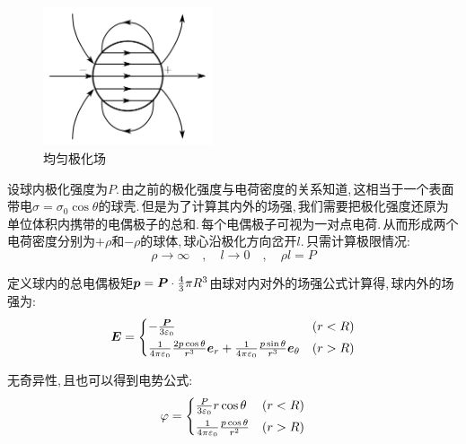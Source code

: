 \begin{figure}
\vspace{-0.4cm}
\centering
\includegraphics[width=5cm]{image/7-1-22.png}
\caption{均匀极化场}
\end{figure}
设球内极化强度为$P$.\,由之前的极化强度与电荷密度的关系知道,\,这相当于一个表面带电$\sigma=\sigma_0\cos\theta$的球壳.\,但是为了计算其内外的场强,\,我们需要把极化强度还原为单位体积内携带的电偶极子的总和.\,每个电偶极子可视为一对点电荷.\,从而形成两个电荷密度分别为$+\rho$和$-\rho$的球体,\,球心沿极化方向岔开$l$.\,只需计算极限情况:
\[\rho\to \infty \quad,\quad l\to 0 \quad,\quad \rho l=P\]

定义球内的总电偶极矩$\boldsymbol{p}=\boldsymbol{P}\cdot\frac{4}{3}\pi R^3$由球对内对外的场强公式计算得,\,球内外的场强为:
\[\boldsymbol{E}=\begin{cases}
-\frac{\boldsymbol{P}}{3\varepsilon_0}&(r<R)\\[3pt]
\frac{1}{4\pi\varepsilon_0} \frac{2p\cos\theta}{r^3}\boldsymbol{e}_r + \frac{1}{4\pi\varepsilon_0} \frac{p\sin\theta}{r^3}\boldsymbol{e}_\theta &(r>R)
\end{cases}\]

无奇异性,\,且也可以得到电势公式:
\[\varphi=\begin{cases}
\frac{P}{3\varepsilon_0}r\cos\theta &(r<R)\\[3pt]
\frac{1}{4\pi\varepsilon_0} \frac{p\cos\theta}{r^2}&(r>R)
\end{cases}\]

